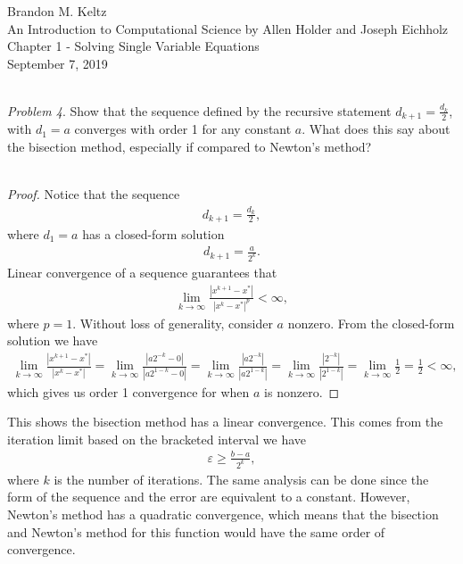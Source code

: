 \documentclass{article}
\begin{document}
	
	\begin{flushleft}	
	
		Brandon M. Keltz\\
		An Introduction to Computational Science by Allen Holder and Joseph Eichholz\\
		Chapter 1 - Solving Single Variable Equations\\
		September 7, 2019\\\
		
		\textit{Problem 4}. Show that the sequence defined by the recursive statement $d_{k + 1} = \frac{d_k}{2}$, with $d_1 = a$ converges with order 1 for any constant $a$. What does this say about the bisection method, especially if compared to Newton's method? \\\
		
		\begin{proof}
			
			Notice that the sequence
			\begin{align*}
				d_{k + 1} = \frac{d_k}{2},
			\end{align*}					
			where $d_1 = a$ has a closed-form solution
			\begin{align*}
				d_{k + 1} = \frac{a}{2^k}.
			\end{align*}
			Linear convergence of a sequence guarantees that
			\begin{align*}
				\lim_{k \to \infty} \frac{\left| x^{k + 1} - x^* \right|}{\left| x^k - x^* \right|^p} < \infty,
			\end{align*}
			where $p = 1$. Without loss of generality, consider $a$ nonzero. From the closed-form solution we have
			\begin{align*}
				\lim_{k \to \infty} \frac{\left| x^{k + 1} - x^* \right|}{\left| x^k - x^* \right|} = \lim_{k \to \infty} \frac{\left| a 2^{-k} - 0 \right|}{\left| a 2^{1 - k} - 0 \right|} = \lim_{k \to \infty} \frac{\left| a 2^{-k} \right|}{\left| a 2^{1 - k} \right|} = \lim_{k \to \infty} \frac{\left| 2^{-k} \right|}{\left| 2^{1 - k} \right|} = \lim_{k \to \infty} \frac{1}{2} = \frac{1}{2} < \infty,
			\end{align*}
			which gives us order 1 convergence for when $a$ is nonzero. 
			
		\end{proof}
		
		This shows the bisection method has a linear convergence. This comes from the iteration limit based on the bracketed interval we have
		\begin{align*}
			\varepsilon \geq \frac{b - a}{2^k},
		\end{align*}
		where $k$ is the number of iterations. The same analysis can be done since the form of the sequence and the error are equivalent to a constant. However, Newton's method has a quadratic convergence, which means that the bisection and Newton's method for this function would have the same order of convergence.
	
	\end{flushleft}
	
\end{document}
